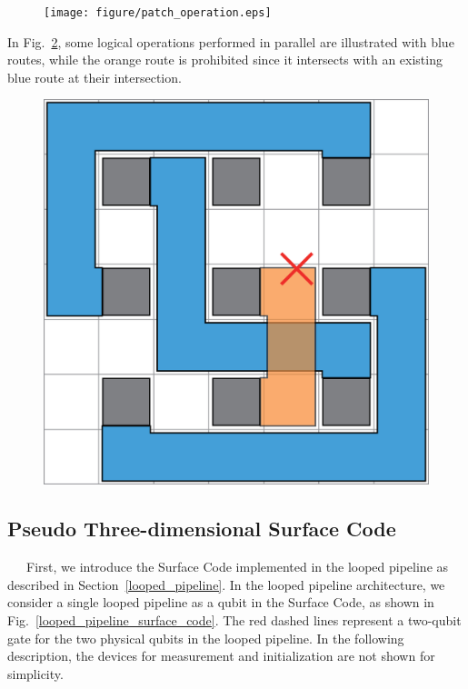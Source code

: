 \documentclass[a4paper,11pt]{ltjsarticle}
\begin{document}
{{        \begin{figure}[h]
            \centering
            \texttt{[image: figure/patch\_operation.eps]}
            \vspace{0pt}\caption{}
            \label{patch_operation}
            \vspace{-10pt}
        \end{figure}
        
        In Fig.~\ref{qubit_plane}, some logical operations performed in parallel are illustrated with blue routes, while the orange route is prohibited since it intersects with an existing blue route at their intersection.
        \clearpage

        \begin{figure}[h]
            \centering
            \includegraphics[scale=0.20]{figure/qubit_plane.eps}
            \vspace{0pt}\caption{}
            \label{qubit_plane}
            \vspace{-10pt}
        \end{figure}
        
    }

    \subsection{Pseudo Three-dimensional Surface Code}{
        \ \ \ First, we introduce the Surface Code implemented in the looped pipeline as described in Section~\ref{looped_pipeline}. In the looped pipeline architecture, we consider a single looped pipeline as a qubit in the Surface Code, as shown in Fig.~\ref{looped_pipeline_surface_code}. The red dashed lines represent a two-qubit gate for the two physical qubits in the looped pipeline. In the following description, the devices for measurement and initialization are not shown for simplicity.

}}
\end{document}
